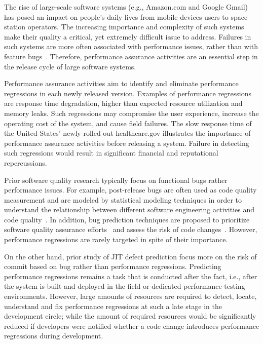 
The rise of large-scale software systems (e.g., Amazon.com and Google Gmail) has posed an impact on people's daily lives from mobile devices users to space station operators. The increasing importance and complexity of such systems make their quality a critical, yet extremely difficult issue to address. Failures in such systems are more often associated with performance issues, rather than with feature bugs~\cite{Weyuker:2000}. Therefore, performance assurance activities are an essential step in the release cycle of large software systems. 

Performance assurance activities aim to identify and eliminate performance regressions in each newly released version. Examples of performance regressions are response time degradation, higher than expected resource utilization and memory leaks. Such regressions may compromise the user experience, increase the operating cost of the system, and cause field failures. The slow response time of the United States' newly rolled-out healthcare.gov illustrates the importance of performance assurance activities before releasing a system. Failure in detecting such regressions would result in significant financial and reputational repercussions.

Prior software quality research typically focus on functional bugs rather performance issues. For example, post-release bugs are often used as code quality measurement and are modeled by statistical modeling techniques in order to understand the relationship between different software engineering activities and code quality~\cite{Hassan:2009:PFU}. In addition, bug prediction techniques are proposed to prioritize software quality assurance efforts~\cite{Zimmermann:2007:PDE,Nagappan:2005:URC,Nagappan:2006:MMP} and assess the risk of code changes~\cite{emadjit}. However, performance regressions are rarely targeted in spite of their importance.

On the other hand, prior study of JIT defect prediction focus more on the risk of commit based on bug rather than performance regressions. Predicting performance regressions remains a task that is conducted after the fact, i.e., after the system is built and deployed in the field or dedicated performance testing environments. However, large amounts of resources are required to detect, locate, understand and fix performance regressions at such a late stage in the development circle; while the amount of required resources would be significantly reduced if developers were notified whether a code change introduces performance regressions during development. 

